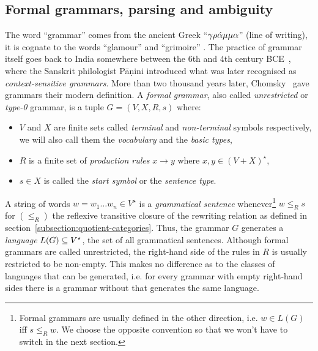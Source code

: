 
\subsection{Formal grammars, parsing and ambiguity}\label{subsection:chomsky}

The word ``grammar'' comes from the ancient Greek ``$\rm{\gamma \rho\acute{\alpha}\mu\mu\alpha}$'' (line of writing), it is cognate to the words ``glamour'' and ``grimoire'' \cite{RuppliThorel05, Davies10, Lambek14}.
The practice of grammar itself goes back to India somewhere between the 6th and 4th century BCE~\cite{BhateKak93}, where the Sanskrit philologist P\={a}\d{n}ini introduced what was later recognised as \emph{context-sensitive grammars}.
More than two thousand years later, Chomsky~\cite{Chomsky56,Chomsky57} gave grammars their modern definition.
A \emph{formal grammar}, also called \emph{unrestricted} or \emph{type-0} grammar, is a tuple $G = (V, X, R, s)$ where:
\begin{itemize}
    \item $V$ and $X$ are finite sets called \emph{terminal} and \emph{non-terminal} symbols respectively, we will also call them the \emph{vocabulary} and the \emph{basic types},
    \item $R$ is a finite set of \emph{production rules} $x \to y$ where $x, y \in (V + X)^\star$,
    \item $s \in X$ is called the \emph{start symbol} or the \emph{sentence type}.
\end{itemize}
A string of words $w = w_1 \dots w_n \in V^\star$ is a \emph{grammatical sentence} whenever\footnote
{Formal grammars are usually defined in the other direction, i.e. $w \in L(G)$ iff $s \leq_R w$.
We choose the opposite convention so that we won't have to switch in the next section.} $w \leq_R s$
for $(\leq_R)$ the reflexive transitive closure of the rewriting relation as defined in section~\ref{subsection:quotient-categories}.
Thus, the grammar $G$ generates a \emph{language} $L(G) \subseteq V^\star$, the set of all grammatical sentences.
Although formal grammars are called unrestricted, the right-hand side of the rules in $R$ is usually restricted to be non-empty.
This makes no difference as to the classes of languages that can be generated, i.e. for every grammar with empty right-hand sides there is a grammar without that generates the same language.

